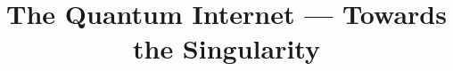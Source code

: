 \documentclass[aps,rmp,reprint,amsmath,amssymb,graphicx,longbibliography]{revtex4-1}
\begin{document}
\title{The Quantum Internet --- Towards the Singularity}

\maketitle









\end{document}

